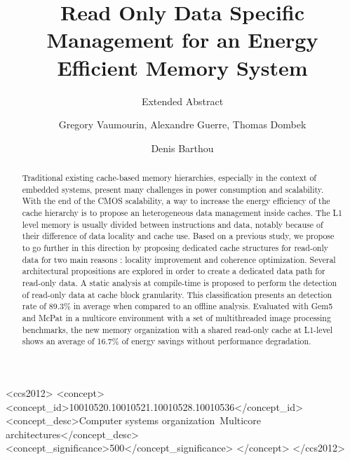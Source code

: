 \documentclass[sigconf]{acmart}
\begin{document}
\title{Read Only Data Specific Management for an Energy Efficient Memory System}
\subtitle{Extended Abstract}


\author{Gregory Vaumourin, Alexandre Guerre, Thomas Dombek}


\author{Denis Barthou}


\begin{abstract}
Traditional existing cache-based memory hierarchies, especially in the context of embedded systems, present many challenges in power consumption and scalability. With the end of the CMOS scalability, a way to increase the energy efficiency of the cache hierarchy is to propose an heterogeneous data management inside caches. The L1 level memory is usually divided between instructions and data, notably because of their difference of data locality and cache use. Based on a previous study\cite{vaumourin:2014}, we propose to go further in this direction by proposing dedicated cache structures for read-only data for two main reasons : locality improvement and coherence optimization. Several architectural propositions are explored in order to create a dedicated data path for read-only data. A static analysis at compile-time is proposed to perform the detection of read-only data at cache block granularity. This classification presents an detection rate of 89.3\% in average when compared to an offline analysis. Evaluated with Gem5 and McPat in a multicore environment with a set of multithreaded image processing benchmarks, the new memory organization with a shared read-only cache at L1-level shows an average of 16.7\% of energy savings without performance degradation. 
\end{abstract}

%
%

 \begin{CCSXML}
<ccs2012>
<concept>
<concept_id>10010520.10010521.10010528.10010536</concept_id>
<concept_desc>Computer systems organization~Multicore architectures</concept_desc>
<concept_significance>500</concept_significance>
</concept>
</ccs2012>
\end{CCSXML}
\end{document}
